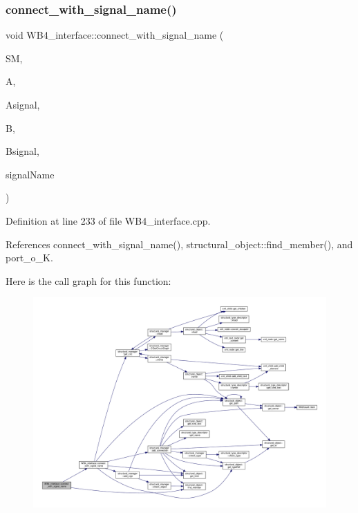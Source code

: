 \subsubsection{\texorpdfstring{connect\+\_\+with\+\_\+signal\+\_\+name()}{connect\_with\_signal\_name()}\hspace{0.1cm}{\footnotesize\ttfamily [3/3]}}
{\footnotesize\ttfamily void W\+B4\+\_\+interface\+::connect\+\_\+with\+\_\+signal\+\_\+name (\begin{DoxyParamCaption}\item[{\hyperlink{structural__manager_8hpp_ab3136f0e785d8535f8d252a7b53db5b5}{structural\+\_\+manager\+Ref}}]{SM,  }\item[{\hyperlink{structural__objects_8hpp_a8ea5f8cc50ab8f4c31e2751074ff60b2}{structural\+\_\+object\+Ref}}]{A,  }\item[{std\+::string}]{Asignal,  }\item[{\hyperlink{structural__objects_8hpp_a8ea5f8cc50ab8f4c31e2751074ff60b2}{structural\+\_\+object\+Ref}}]{B,  }\item[{std\+::string}]{Bsignal,  }\item[{const std\+::string \&}]{signal\+Name }\end{DoxyParamCaption})\hspace{0.3cm}{\ttfamily [protected]}}



Definition at line 233 of file W\+B4\+\_\+interface.\+cpp.



References connect\+\_\+with\+\_\+signal\+\_\+name(), structural\+\_\+object\+::find\+\_\+member(), and port\+\_\+o\+\_\+K.

Here is the call graph for this function\+:
\nopagebreak
\begin{figure}[H]
\begin{center}
\leavevmode
\includegraphics[width=350pt]{d5/d7a/classWB4__interface_a114e79d54311ed8d17711f293fbc73c9_cgraph}
\end{center}
\end{figure}
\mbox{\label{classWB4__interface_abcc03869191ef61861fe936ae8dcd96a}} 
